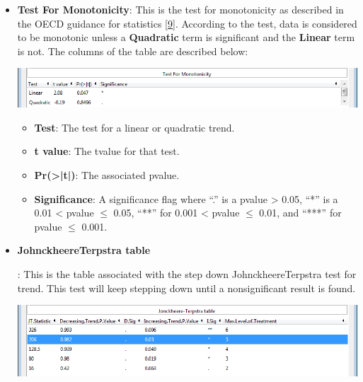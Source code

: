 \documentclass[a4paper]{article}
\begin{document}
\begin{enumerate}
		
		
		
		\begin{itemize}
			\item \textbf{Test For Monotonicity}: This is the test for monotonicity as described in the OECD 
				guidance for statistics [\hyperlink{R9}{9}]. According to the test, data is considered to be monotonic unless a \textbf{Quadratic} 
				term is significant and the \textbf{Linear} term is not. 
				The columns of the table are described below:
				
				\hypertarget{fig:MonoTest}{}
				\begin{center}
				\includegraphics[width=\textwidth,keepaspectratio]{MonoTest.png}
				\end{center} 
				
				\begin{itemize}
					\item \textbf{Test}: The test for a linear or quadratic trend. 
					\item \textbf{t value}: The t\textendash{}value for that test.
					\item \textbf{Pr(>|t|)}: The associated p\textendash{}value.
					\item \textbf{Significance}: A significance flag where  ``.'' is a p\textendash{}value > 0.05, ``*'' is
						a 0.01 < p\textendash{}value $\leq$  0.05, ``**'' for 0.001 < p\textendash{}value $\leq$  0.01, and ``***'' for p\textendash{}value $\leq$  0.001.  
				\end{itemize}


			\item \hypertarget{aly:JT}{\textbf{Johnckheere\textendash{}Terpstra table}}: This is the table associated with the step down Johnckheere\textendash{}Terpstra test for trend.	
				This test will keep stepping down until a non\textendash{}significant result is found. 
				
		
				\begin{center}
				\includegraphics[width=\textwidth,keepaspectratio]{JTTest.png}
				\end{center} 
		

\end{itemize}
\end{enumerate}
\end{document}
